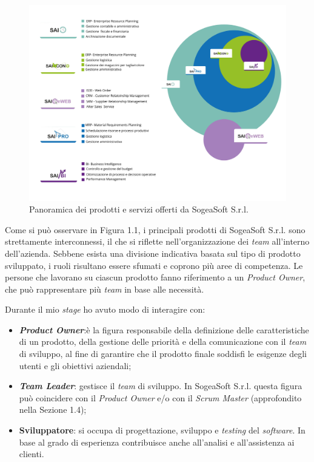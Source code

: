     \begin{figure}
        \centering
        \includegraphics[width=0.9\linewidth]{BCS-Tessi/images/SOGEAProdotti.png}
        \caption[Prodotti di SogeaSoft S.r.l.]{Panoramica dei prodotti e servizi offerti da SogeaSoft S.r.l.}
        \label{fig:panoramica_prodotti}
    \end{figure}

    \noindent Come si può osservare in Figura 1.1, i principali prodotti di SogeaSoft S.r.l. sono strettamente interconnessi, il che si riflette nell’organizzazione dei \textit{team} all’interno dell’azienda. Sebbene esista una divisione indicativa basata sul tipo di prodotto sviluppato, i ruoli risultano essere sfumati e coprono più aree di competenza. 
    \noindent Le persone che lavorano su ciascun prodotto fanno riferimento a un \textit{Product Owner}, che può rappresentare più \textit{team} in base alle necessità.

    \noindent Durante il mio \textit{stage} ho avuto modo di interagire con: 
    \begin{itemize}
        \item \textbf{\textit{Product Owner}}:è la figura responsabile della definizione delle caratteristiche di un prodotto, della gestione delle priorità e della comunicazione con il \textit{team} di sviluppo, al fine di garantire che il prodotto finale soddisfi le esigenze degli utenti e gli obiettivi aziendali;
        
        \item \textbf{\textit{Team Leader}}: gestisce il \textit{team} di sviluppo. In SogeaSoft S.r.l. questa figura può coincidere con il \textit{Product Owner} e/o con il \textit{Scrum Master} (approfondito nella Sezione 1.4);
        \item \textbf{Sviluppatore}: si occupa di progettazione, sviluppo e \textit{testing} del \textit{software}. In base al grado di esperienza contribuisce anche all'analisi e all'assistenza ai clienti. 
    \end{itemize}


